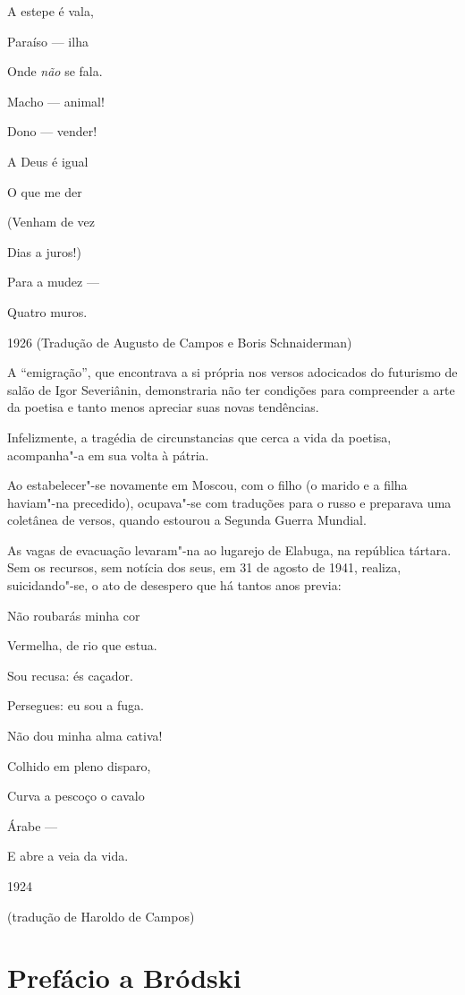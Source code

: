 A estepe é vala,

Paraíso --- ilha

Onde \emph{não} se fala.

Macho --- animal!

Dono --- vender!

A Deus é igual

O que me der

(Venham de vez

Dias a juros!)

Para a mudez ---

Quatro muros.

1926 (Tradução de Augusto de Campos e Boris Schnaiderman)

A ``emigração'', que encontrava a si própria nos versos adocicados do
futurismo de salão de Igor Severiânin, demonstraria não ter condições
para compreender a arte da poetisa e tanto menos apreciar suas novas
tendências.

Infelizmente, a tragédia de circunstancias que cerca a vida da poetisa,
acompanha"-a em sua volta à pátria.

Ao estabelecer"-se novamente em Moscou, com o filho (o marido e a filha
haviam"-na precedido), ocupava"-se com traduções para o russo e preparava
uma coletânea de versos, quando estourou a Segunda Guerra Mundial.

As vagas de evacuação levaram"-na ao lugarejo de Elabuga, na república
tártara. Sem os recursos, sem notícia dos seus, em 31 de agosto de 1941,
realiza, suicidando"-se, o ato de desespero que há tantos anos previa:

Não roubarás minha cor

Vermelha, de rio que estua.

Sou recusa: és caçador.

Persegues: eu sou a fuga.

Não dou minha alma cativa!

Colhido em pleno disparo,

Curva a pescoço o cavalo

Árabe ---

E abre a veia da vida.

1924

(tradução de Haroldo de Campos)

\chapter{Prefácio a Bródski}

